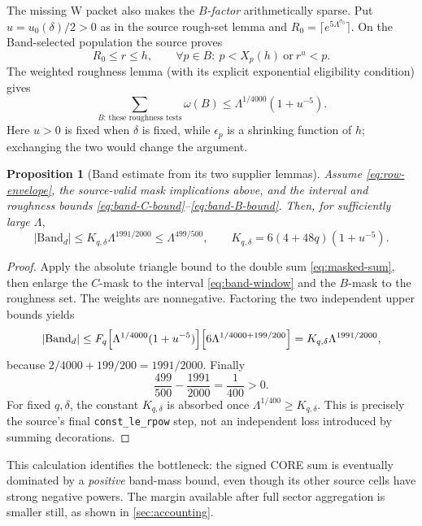 \documentclass[11pt]{article}
\newcommand{\Lam}{\Lambda}
\newcommand{\omegaR}{\omega}
\newcommand{\epsp}{\epsilon_p}
\newtheorem{proposition}[theorem]{Proposition}
\theoremstyle{definition}
\theoremstyle{remark}
\newcommand{\1}{\mathbf 1}
\begin{document}
The missing W packet also makes the \emph{$B$-factor} arithmetically
sparse. Put $u=u_0(\delta)/2>0$ as in the source rough-set
lemma and $R_0=\lceil e^{5\Lam^{\sigma_0}}\rceil$.
On the Band-selected population the source proves
\[
 R_0\le r\le h,\qquad
 \forall p\in B:\ p<X_p(h)\ \text{or}\ r^u<p.
\]
The weighted roughness lemma (with its explicit exponential
eligibility condition) gives
\begin{equation}\label{eq:band-B-bound}
 \sum_{B:\,\text{these roughness tests}}\omegaR(B)
 \le \Lam^{1/4000}(1+u^{-5}).
\end{equation}
Here $u>0$ is fixed when $\delta$ is fixed, while $\epsp$
is a shrinking function of $h$; exchanging the two would
change the argument.

\begin{proposition}[Band estimate from its two supplier lemmas]
\label{prop:band-chain}
Assume \eqref{eq:row-envelope}, the source-valid mask implications
above, and the interval and roughness bounds
\eqref{eq:band-C-bound}--\eqref{eq:band-B-bound}.
Then, for sufficiently large $\Lam$,
\begin{equation}\label{eq:band-chain}
 |\mathrm{Band}_d|
 \le K_{q,\delta}\Lam^{1991/2000}
 \le\Lam^{499/500},\qquad
 K_{q,\delta}=6(4+48q)(1+u^{-5}).
\end{equation}
\end{proposition}
\begin{proof}
Apply the absolute triangle bound to the double sum
\eqref{eq:masked-sum}, then enlarge the $C$-mask to the interval
\eqref{eq:band-window} and the $B$-mask to the roughness
set. The weights are nonnegative. Factoring the two independent
upper bounds yields
\[
 |\mathrm{Band}_d|
 \le F_q\Bigl[\Lam^{1/4000}(1+u^{-5})\Bigr]
       \Bigl[6\Lam^{1/4000+199/200}\Bigr]
 =K_{q,\delta}\Lam^{1991/2000},
\]
because $2/4000+199/200=1991/2000$. Finally
\[
 \frac{499}{500}-\frac{1991}{2000}=\frac1{400}>0.
\]
For fixed $q,\delta$, the constant $K_{q,\delta}$ is absorbed
once $\Lam^{1/400}\ge K_{q,\delta}$. This is precisely
the source's final \texttt{const\_le\_rpow} step, not an
independent loss introduced by summing decorations.
\end{proof}

This calculation identifies the bottleneck: the signed CORE
sum is eventually dominated by a \emph{positive} band-mass
bound, even though its other source cells have strong negative
powers. The margin available after full sector aggregation is
smaller still, as shown in \cref{sec:accounting}.
\end{document}
